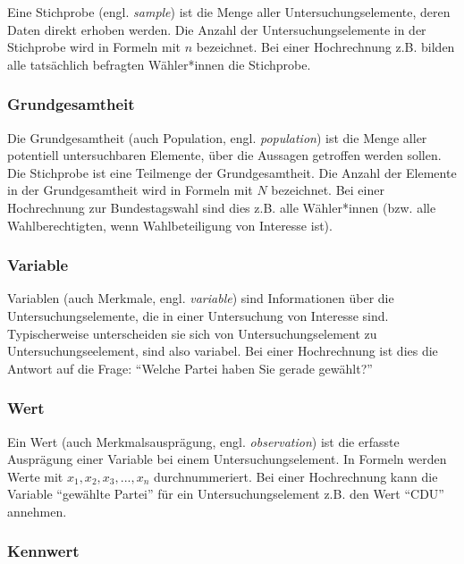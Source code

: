\documentclass[
  11pt,
  ngerman,
  a4paper,
]{report}
\begin{document}
Eine Stichprobe (engl. \emph{sample}) ist die Menge aller Untersuchungselemente, deren Daten direkt erhoben werden. Die Anzahl der Untersuchungselemente in der Stichprobe wird in Formeln mit \(n\) bezeichnet. Bei einer Hochrechnung z.B. bilden alle tatsächlich befragten Wähler*innen die Stichprobe.

\hypertarget{grundgesamtheit}{%
\subsubsection{Grundgesamtheit}\label{grundgesamtheit}}

Die Grundgesamtheit (auch Population, engl. \emph{population}) ist die Menge aller potentiell untersuchbaren Elemente, über die Aussagen getroffen werden sollen. Die Stichprobe ist eine Teilmenge der Grundgesamtheit. Die Anzahl der Elemente in der Grundgesamtheit wird in Formeln mit \(N\) bezeichnet. Bei einer Hochrechnung zur Bundestagswahl sind dies z.B. alle Wähler*innen (bzw. alle Wahlberechtigten, wenn Wahlbeteiligung von Interesse ist).

\hypertarget{variable}{%
\subsubsection{Variable}\label{variable}}

Variablen (auch Merkmale, engl. \emph{variable}) sind Informationen über die Untersuchungselemente, die in einer Untersuchung von Interesse sind. Typischerweise unterscheiden sie sich von Untersuchungselement zu Untersuchungseelement, sind also variabel. Bei einer Hochrechnung ist dies die Antwort auf die Frage: \enquote{Welche Partei haben Sie gerade gewählt?}

\hypertarget{wert}{%
\subsubsection{Wert}\label{wert}}

Ein Wert (auch Merkmalsausprägung, engl. \emph{observation}) ist die erfasste Ausprägung einer Variable bei einem Untersuchungselement. In Formeln werden Werte mit \(x_1, x_2, x_3, ..., x_n\) durchnummeriert. Bei einer Hochrechnung kann die Variable \enquote{gewählte Partei} für ein Untersuchungselement z.B. den Wert \enquote{CDU} annehmen.

\hypertarget{kennwert}{%
\subsubsection{Kennwert}\label{kennwert}}
\end{document}
